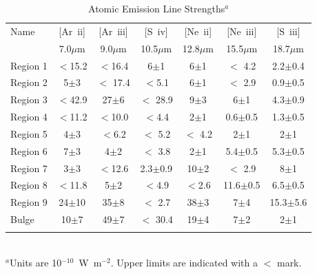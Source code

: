 \begin{table}
 \centering
 \begin{minipage}{100mm}
\caption{Atomic Emission Line Strengths$^a$}
  \begin{tabular}{l c c  c  c  c  c  }
  \hline{Name  }&{[Ar~{\sc ii}] }&{[Ar~{\sc iii}]  }&{[S~{\sc iv}]}&{[Ne~{\sc ii}]   }&{[Ne~{\sc iii}]   }&{[S~{\sc iii}]  }\\
{}&{\tiny{7.0$\mu$m} }&{\tiny{9.0$\mu$m }}&{\tiny{10.5$\mu$m}}&{\tiny{12.8$\mu$m  }}&{\tiny{15.5$\mu$m } }&{\tiny{18.7$\mu$m }} 
   \\
 \hline 
 
Region 1 &    $<$15.2                 & $<$16.4                 & 6$\pm$1                 & 6$\pm$1                 & $<$ 4.2                 & 2.2$\pm$0.4                \\
Region 2 &    5$\pm$3                 & $<$ 17.4               & $<$5.1                    & 6$\pm$1                 & $<$ 2.9                 & 0.9$\pm$0.5                 \\
Region 3 &    $<$42.9                 & 27$\pm$6              & $<$ 28.9                & 9$\pm$3                 & 6$\pm$1               & 4.3$\pm$0.9                 \\
Region 4 &    $<$11.2                 & $<$10.0                 & $<$4.4                    & 2$\pm$1                 & 0.6$\pm$0.5        & 1.3$\pm$0.5                 \\
Region 5 &    4$\pm$3                 & $<$6.2                   & $<$ 5.2                 & $<$ 4.2                     & 2$\pm$1               & 2$\pm$1                 \\
Region 6 &    7$\pm$3                & 4$\pm$2                 & $<$ 3.8                 & 2$\pm$1                  & 5.4$\pm$0.5         & 5.3$\pm$0.5                 \\
Region 7 &    3$\pm$3                 & $<$12.6                 & 2.3$\pm$0.9        & 10$\pm$2                & $<$ 2.9                 & 8$\pm$1                \\
Region 8 &    $<$11.8                  & 5$\pm$2                & $<$4.9                  & $<$2.6                       & 11.6$\pm$0.5     & 6.5$\pm$0.5                 \\
Region 9 &    24$\pm$10             & 35$\pm$8             & $<$ 2.7                 & 38$\pm$3                 & 7$\pm$4               & 15.3$\pm$5.6                 \\
Bulge &          10$\pm$7               & 49$\pm$7              & $<$ 30.4               & 19$\pm$4                 & 7$\pm$2               & 2$\pm$1      \\           

\hline
 \label{Atomic}
\end{tabular}\\
{ $^a$Units are 10$^{-10}$~W~m$^{-2}$. Upper limits are indicated with a $<$ mark.  }

\end{minipage}
\end{table}



